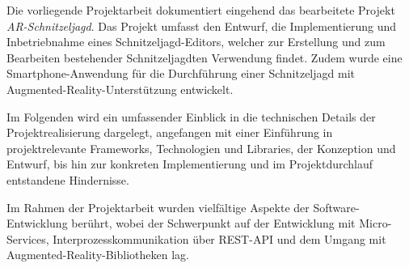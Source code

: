 Die vorliegende Projektarbeit dokumentiert eingehend das bearbeitete Projekt \textit{AR-Schnitzeljagd}. Das Projekt umfasst den Entwurf, die Implementierung und Inbetriebnahme eines Schnitzeljagd-Editors, welcher zur Erstellung und zum Bearbeiten bestehender Schnitzeljagdten Verwendung findet. Zudem wurde eine Smartphone-Anwendung für die Durchführung einer Schnitzeljagd mit Augmented-Reality-Unterstützung entwickelt.

Im Folgenden wird ein umfassender Einblick in die technischen Details der Projektrealisierung dargelegt, angefangen mit einer Einführung in projektrelevante Frameworks, Technologien und Libraries, der Konzeption und Entwurf, bis hin zur konkreten Implementierung und im Projektdurchlauf entstandene Hindernisse.

Im Rahmen der Projektarbeit wurden vielfältige Aspekte der Software-Entwicklung berührt, wobei der Schwerpunkt auf der Entwicklung mit Micro-Services, Interprozesskommunikation über REST-API und dem Umgang mit Augmented-Reality-Bibliotheken lag.
